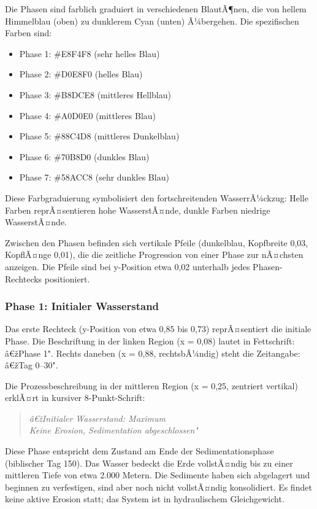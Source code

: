 Die Phasen sind farblich graduiert in verschiedenen BlautÃ¶nen, die von hellem Himmelblau (oben) zu dunklerem Cyan (unten) Ã¼bergehen. Die spezifischen Farben sind:
\begin{itemize}
    \item Phase 1: \#E8F4F8 (sehr helles Blau)
    \item Phase 2: \#D0E8F0 (helles Blau)
    \item Phase 3: \#B8DCE8 (mittleres Hellblau)
    \item Phase 4: \#A0D0E0 (mittleres Blau)
    \item Phase 5: \#88C4D8 (mittleres Dunkelblau)
    \item Phase 6: \#70B8D0 (dunkles Blau)
    \item Phase 7: \#58ACC8 (sehr dunkles Blau)
\end{itemize}

Diese Farbgraduierung symbolisiert den fortschreitenden WasserrÃ¼ckzug: Helle Farben reprÃ¤sentieren hohe WasserstÃ¤nde, dunkle Farben niedrige WasserstÃ¤nde.

Zwischen den Phasen befinden sich vertikale Pfeile (dunkelblau, Kopfbreite 0,03, KopflÃ¤nge 0,01), die die zeitliche Progression von einer Phase zur nÃ¤chsten anzeigen. Die Pfeile sind bei y-Position etwa 0,02 unterhalb jedes Phasen-Rechtecks positioniert.

\subsubsection*{Phase 1: Initialer Wasserstand}

Das erste Rechteck (y-Position von etwa 0,85 bis 0,73) reprÃ¤sentiert die initiale Phase. Die Beschriftung in der linken Region (x = 0,08) lautet in Fettschrift: â€žPhase 1". Rechts daneben (x = 0,88, rechtsbÃ¼ndig) steht die Zeitangabe: â€žTag 0--30".

Die Prozessbeschreibung in der mittleren Region (x = 0,25, zentriert vertikal) erklÃ¤rt in kursiver 8-Punkt-Schrift:
\begin{quote}
\textit{â€žInitialer Wasserstand: Maximum\\
Keine Erosion, Sedimentation abgeschlossen"}
\end{quote}

Diese Phase entspricht dem Zustand am Ende der Sedimentationsphase (biblischer Tag 150). Das Wasser bedeckt die Erde vollstÃ¤ndig bis zu einer mittleren Tiefe von etwa 2.000 Metern. Die Sedimente haben sich abgelagert und beginnen zu verfestigen, sind aber noch nicht vollstÃ¤ndig konsolidiert. Es findet keine aktive Erosion statt; das System ist in hydraulischem Gleichgewicht.

